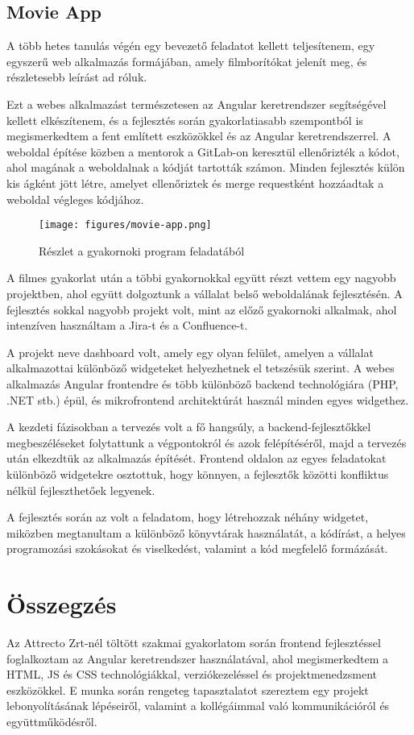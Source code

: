 \subsection*{Movie App}
\par A több hetes tanulás végén egy bevezető feladatot kellett teljesítenem, egy egyszerű web alkalmazás formájában, amely filmborítókat jelenít meg, és részletesebb leírást ad róluk.
\par Ezt a webes alkalmazást természetesen az Angular keretrendszer segítségével kellett elkészítenem, és a fejlesztés során gyakorlatiasabb szempontból is megismerkedtem a fent említett eszközökkel és az Angular keretrendszerrel. A weboldal építése közben a mentorok a GitLab-on keresztül ellenőrizték a kódot, ahol magának a weboldalnak a kódját tartották számon. Minden fejlesztés külön kis ágként jött létre, amelyet ellenőriztek és merge requestként hozzáadtak a weboldal végleges kódjához.
\begin{figure}[H]
    \centering
    \texttt{[image: figures/movie-app.png]}
    \captionsetup{labelformat=empty}
    \caption{Részlet a gyakornoki program feladatából}   
\end{figure}
\par A filmes gyakorlat után a többi gyakornokkal együtt részt vettem egy nagyobb projektben, ahol együtt dolgoztunk a vállalat belső weboldalának fejlesztésén. A fejlesztés sokkal nagyobb projekt volt, mint az előző gyakornoki alkalmak, ahol intenzíven használtam a Jira-t és a Confluence-t.
\par A projekt neve dashboard volt, amely egy olyan felület, amelyen a vállalat alkalmazottai különböző widgeteket helyezhetnek el tetszésük szerint. A webes alkalmazás Angular frontendre és több különböző backend technológiára (PHP, .NET stb.) épül, és mikrofrontend architektúrát használ minden egyes widgethez.
\par A kezdeti fázisokban a tervezés volt a fő hangsúly, a backend-fejlesztőkkel megbeszéléseket folytattunk a végpontokról és azok felépítéséről, majd a tervezés után elkezdtük az alkalmazás építését. Frontend oldalon az egyes feladatokat különböző widgetekre osztottuk, hogy könnyen, a fejlesztők közötti konfliktus nélkül fejleszthetőek legyenek.
\par A fejlesztés során az volt a feladatom, hogy létrehozzak néhány widgetet, miközben megtanultam a különböző könyvtárak használatát, a kódírást, a helyes programozási szokásokat és viselkedést, valamint a kód megfelelő formázását.
\section*{Összegzés}
\par Az Attrecto Zrt-nél töltött szakmai gyakorlatom során frontend fejlesztéssel foglalkoztam az Angular keretrendszer használatával, ahol megismerkedtem a HTML, JS és CSS technológiákkal, verziókezeléssel és projektmenedzsment eszközökkel. E munka során rengeteg tapasztalatot szereztem egy projekt lebonyolításának lépéseiről, valamint a kollégáimmal való kommunikációról és együttműködésről.
